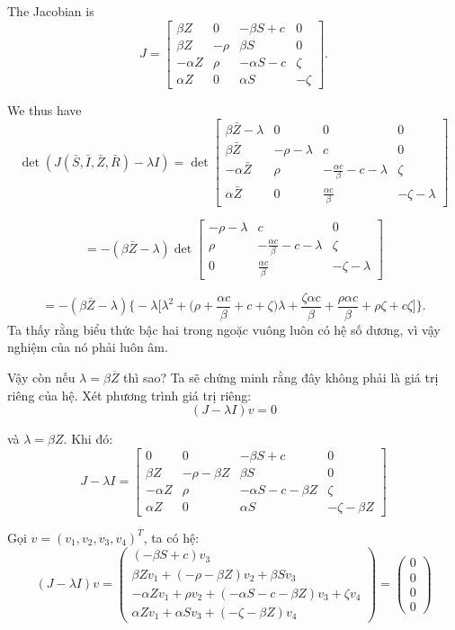 \documentclass[12pt]{scrartcl}
\begin{document}
The Jacobian is
\[
J =
\begin{bmatrix}
\beta Z & 0 & -\beta S + c & 0 \\[6pt]
\beta Z & -\rho & \beta S & 0 \\[6pt]
-\alpha Z & \rho & -\alpha S - c & \zeta \\[6pt]
\alpha Z & 0 & \alpha S & -\zeta
\end{bmatrix}.
\]

We thus have
\[
\det(J(\bar{S}, \bar{I}, \bar{Z}, \bar{R}) - \lambda I) =
\det
\begin{bmatrix}
\beta \bar{Z} -\lambda & 0 & 0 & 0 \\[6pt]
\beta \bar{Z} & -\rho -\lambda & c & 0 \\[6pt]
-\alpha \bar{Z} & \rho & -\frac{\alpha c}{\beta} - c - \lambda & \zeta \\[6pt]
\alpha \bar{Z} & 0 & \frac{\alpha c}{\beta} & -\zeta - \lambda
\end{bmatrix}
\]

\[
= -(\beta \bar{Z} - \lambda)
\det
\begin{bmatrix}
-\rho - \lambda& c & 0 \\[6pt]
\rho & -\frac{\alpha c}{\beta} - c- \lambda & \zeta \\[6pt]
0 & \frac{\alpha c}{\beta} & -\zeta- \lambda
\end{bmatrix}
\]

\[
= -(\beta \bar{Z} - \lambda)
\bigg\{
-\lambda \bigg[
\lambda^2 + 
\bigg( \rho + \frac{\alpha c}{\beta} + c + \zeta \bigg) \lambda
+ \frac{\zeta \alpha c}{\beta} + \frac{\rho \alpha c}{\beta} + \rho \zeta + c \zeta
\bigg]
\bigg\}.
\]
Ta thấy rằng biểu thức bậc hai trong ngoặc vuông luôn có hệ số dương, vì vậy nghiệm của nó phải luôn âm.

Vậy còn nếu $\lambda = \beta \overline{Z}$ thì sao? Ta sẽ chứng minh rằng đây không phải là giá trị riêng của hệ. 
Xét phương trình giá trị riêng:
\[
(J - \lambda I) v = 0
\]

và \(\lambda = \beta Z\). Khi đó:
\[
J - \lambda I =
\begin{bmatrix}
0 & 0 & -\beta S + c & 0 \\[6pt]
\beta Z & -\rho - \beta Z & \beta S & 0 \\[6pt]
-\alpha Z & \rho & -\alpha S - c - \beta Z & \zeta \\[6pt]
\alpha Z & 0 & \alpha S & -\zeta - \beta Z
\end{bmatrix}
\]

Gọi \(v = (v_1, v_2, v_3, v_4)^T\), ta có hệ:
\[
(J - \lambda I) v =
\begin{pmatrix}
(-\beta S + c) v_3 \\[6pt]
\beta Z v_1 + (-\rho-\beta Z) v_2 + \beta S v_3 \\[6pt]
-\alpha Z v_1 + \rho v_2 + (-\alpha S - c - \beta Z) v_3 + \zeta v_4 \\[6pt]
\alpha Z v_1 + \alpha S v_3 + (-\zeta-\beta Z) v_4
\end{pmatrix} =
\begin{pmatrix}
0 \\ 0 \\ 0 \\ 0
\end{pmatrix}
\]
\end{document}

